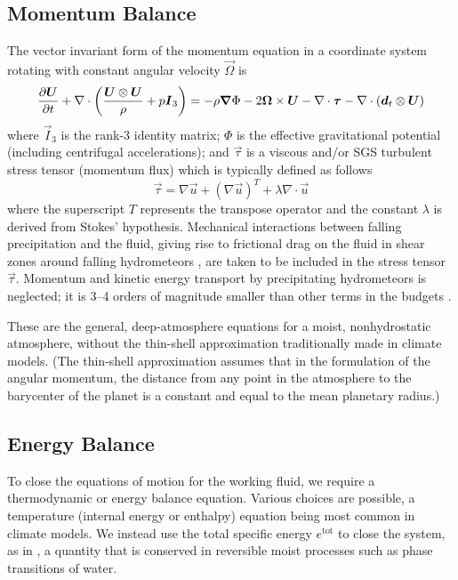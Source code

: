 \documentclass{article}
\begin{document}
\subsection{Momentum Balance}

The vector invariant form of the momentum equation in a coordinate system rotating with constant angular velocity $\vec{\Omega}$ is 
\begin{equation}
\frac{\partial \boldsymbol{{U}}}{\partial t} + \nabla \cdot \left( \frac{\boldsymbol{{U}} \otimes \boldsymbol{{U}} }{\rho} + p \boldsymbol{{I}}_3\right) =  - \rho \boldsymbol{{\nabla}}\Phi - 2\boldsymbol{{\Omega}} \times \boldsymbol{{U}} - \nabla \cdot \boldsymbol{{\tau}} - \nabla \cdot\left( \boldsymbol{{d}}_t \otimes \boldsymbol{{U}} \right)
\label{eq:governing_equations/momentum}
\end{equation}
where $\vec{I}_3$ is the rank-3 identity matrix; $\Phi$ is the effective gravitational potential (including centrifugal accelerations); and $\vec{\tau}$ is a viscous and/or SGS turbulent stress tensor (momentum flux) which is typically defined as follows
\begin{equation}
\vec{\tau}  =  \nabla \vec{u} +  \left( \nabla \vec{u} \right)^T + \lambda \nabla \cdot \vec{u}
\label{eq:governing_equations/momentum/viscous_fluxes}
\end{equation}
where the superscript $T$ represents the transpose operator and the constant $\lambda$ is derived from Stokes' hypothesis.
Mechanical interactions between falling precipitation and the fluid, giving rise to frictional drag on the fluid in shear zones around falling hydrometeors \citep{Pauluis00}, are taken to be included in the stress tensor $\vec{\tau}$. Momentum and kinetic energy transport by precipitating hydrometeors is neglected; it is 3--4 orders of magnitude smaller than other terms in the budgets \citep{Romps08a}.

These are the general, deep-atmosphere equations for a moist, nonhydrostatic atmosphere, without the thin-shell approximation traditionally made in climate models. (The thin-shell approximation assumes that in the formulation of the angular momentum, the distance from any point in the atmosphere to the barycenter of the planet is a constant and equal to the mean planetary radius.)

\subsection{Energy Balance}

To close the equations of motion for the working fluid, we require a thermodynamic or energy balance equation. Various choices are possible, a temperature (internal energy or enthalpy) equation being most common in climate models. We instead use the total specific energy $e^\mathrm{tot}$ to close the system, as in \citet{Romps08a}, a quantity that is conserved in reversible moist processes such as phase transitions of water. 
\end{document}
